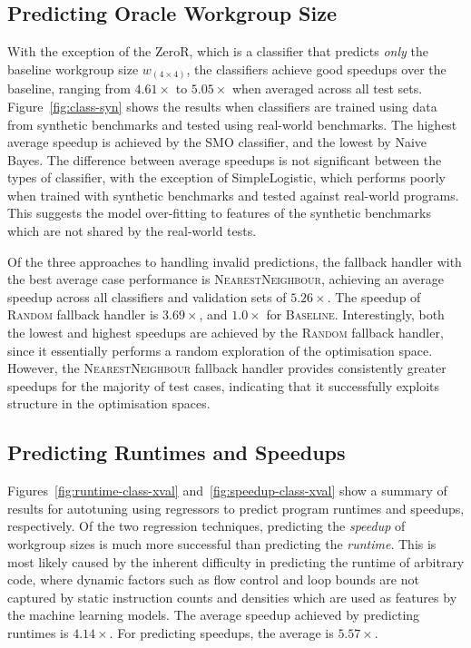 \documentclass[preprint,nonatbib,10pt]{sigplanconf}
\begin{document}
\subsection{Predicting Oracle Workgroup Size}

With the exception of the ZeroR, which is a classifier that predicts
\emph{only} the baseline workgroup size
$w_{\left( 4 \times 4 \right)}$, the classifiers achieve good speedups
over the baseline, ranging from $4.61\times$ to $5.05\times$ when
averaged across all test sets. Figure~\ref{fig:class-syn} shows the
results when classifiers are trained using data from synthetic
benchmarks and tested using real-world benchmarks. The highest average
speedup is achieved by the SMO classifier, and the lowest by Naive
Bayes. The difference between average speedups is not significant
between the types of classifier, with the exception of SimpleLogistic,
which performs poorly when trained with synthetic benchmarks and
tested against real-world programs. This suggests the model
over-fitting to features of the synthetic benchmarks which are not
shared by the real-world tests.

Of the three approaches to handling invalid predictions, the fallback
handler with the best average case performance is
\textsc{NearestNeighbour}, achieving an average speedup across all
classifiers and validation sets of $5.26\times$. The speedup of
\textsc{Random} fallback handler is $3.69\times$, and $1.0\times$ for
\textsc{Baseline}. Interestingly, both the lowest and highest speedups
are achieved by the \textsc{Random} fallback handler, since it
essentially performs a random exploration of the optimisation
space. However, the \textsc{NearestNeighbour} fallback handler
provides consistently greater speedups for the majority of test cases,
indicating that it successfully exploits structure in the optimisation
spaces.


\subsection{Predicting Runtimes and Speedups}

Figures~\ref{fig:runtime-class-xval} and~\ref{fig:speedup-class-xval}
show a summary of results for autotuning using regressors to predict
program runtimes and speedups, respectively. Of the two regression
techniques, predicting the \emph{speedup} of workgroup sizes is much
more successful than predicting the \emph{runtime}. This is most
likely caused by the inherent difficulty in predicting the runtime of
arbitrary code, where dynamic factors such as flow control and loop
bounds are not captured by static instruction counts and densities
which are used as features by the machine learning models. The average
speedup achieved by predicting runtimes is $4.14\times$. For
predicting speedups, the average is $5.57\times$.
\end{document}
